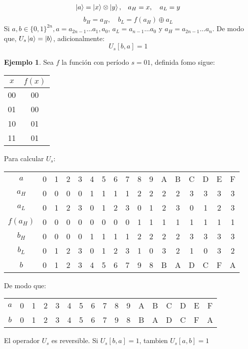 \documentclass{article}
\theoremstyle{definition}
\newtheorem{ejemplo}{Ejemplo}[section]
\begin{document}
%
%

$$
\begin{aligned}
	\ket{a} = \ket{x}\otimes\ket{y},& \quad a_H = x, \quad a_L = y \\
\end{aligned}
$$
$$ b_H = a_H, \quad b_L = f(a_H) \oplus a_L $$
Si $a,b \in \{0,1\}^{2n}, a = a_{2n-1} \ldots a_1, a_0 $, $a_L = a_{n-1} \ldots 
a_0$ y $a_H = a_{2n-1} \ldots a_n$.
De modo que, $U_s\ket{a} = \ket{b}$, adicionalmente:
$$
	U_s[b, a] = 1
$$

\begin{ejemplo}
Sea $f$ la función con período $s=01$, definida fomo sigue:
\begin{tabular}{|c|c|}
	\hline
	$x$ & $f(x)$ \\\hline
	00 & 00 \\
	01 & 00 \\
	10 & 01 \\
	11 & 01 \\\hline
\end{tabular}

Para calcular $U_s$:

\begin{tabular}{|c|cccc|cccc|cccc|cccc|}
	\hline
	$a$     &0&1&2&3& 4&5&6&7& 8&9&A&B &C&D&E&F \\
	$a_H$   &0&0&0&0& 1&1&1&1& 2&2&2&2 &3&3&3&3 \\
	$a_L$   &0&1&2&3& 0&1&2&3& 0&1&2&3 &0&1&2&3 \\
	$f(a_H)$&0&0&0&0& 0&0&0&0& 1&1&1&1 &1&1&1&1 \\
	$b_H$   &0&0&0&0& 1&1&1&1& 2&2&2&2 &3&3&3&3 \\
	$b_L$   &0&1&2&3& 0&1&2&3& 1&0&3&2 &1&0&3&2 \\
	$b$     &0&1&2&3& 4&5&6&7& 9&8&B&A &D&C&F&A \\
	\hline
\end{tabular}

De modo que:

\begin{tabular}{|c|cccc|cccc|cccc|cccc|}
	\hline
	$a$     &0&1&2&3& 4&5&6&7& 8&9&A&B &C&D&E&F \\
	$b$     &0&1&2&3& 4&5&6&7& 9&8&B&A &D&C&F&A \\
	\hline
\end{tabular}

El operador $U_s$ es reversible.
Si $U_s[b,a] = 1$, tambien $U_s[a,b] = 1$



\end{ejemplo}
\end{document}

